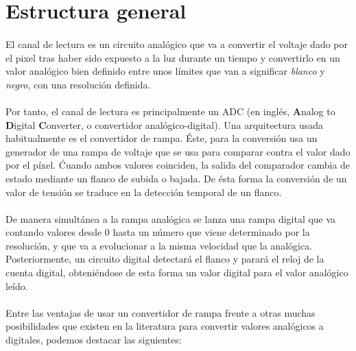 \section{Estructura general}\label{cap:ro_sch_estructura}

\paragraph{}
El canal de lectura es un circuito analógico que va a convertir el voltaje
dado por el pixel tras haber sido expuesto a la luz durante un tiempo y
convertirlo en un valor analógico bien definido entre unos límites que van a
significar \textit{blanco} y \textit{negro}, con una resolución definida.

\paragraph{}
Por tanto, el canal de lectura es principalmente un ADC (en inglés, \textbf{A}nalog
to \textbf{D}igital \textbf{C}onverter, o convertidor analógico-digital).
Una arquitectura usada habitualmente es el convertidor de rampa.
Éste, para la conversión usa un generador de una rampa de voltaje que se usa para
comparar contra el valor dado por el píxel. Ćuando ambos valores coinciden,
la salida del comparador cambia de estado mediante un flanco de subida o bajada.
De ésta forma la conversión de un valor de tensión se traduce en la detección temporal
de un flanco.

\paragraph{}
De manera simultánea a la rampa analógica se lanza una rampa digital que va contando
valores desde 0 hasta un número que viene determinado por la resolución, y que va a
evolucionar a la misma velocidad que la analógica. Posteriormente, un circuito digital
detectará el flanco y parará el reloj de la cuenta digital, obteniéndose de esta forma
un valor digital para el valor analógico leído.

\paragraph{}
Entre las ventajas de usar un convertidor de rampa frente a otras muchas posibilidades
que existen en la literatura para convertir valores analógicos a digitales, podemos
destacar las siguientes:

